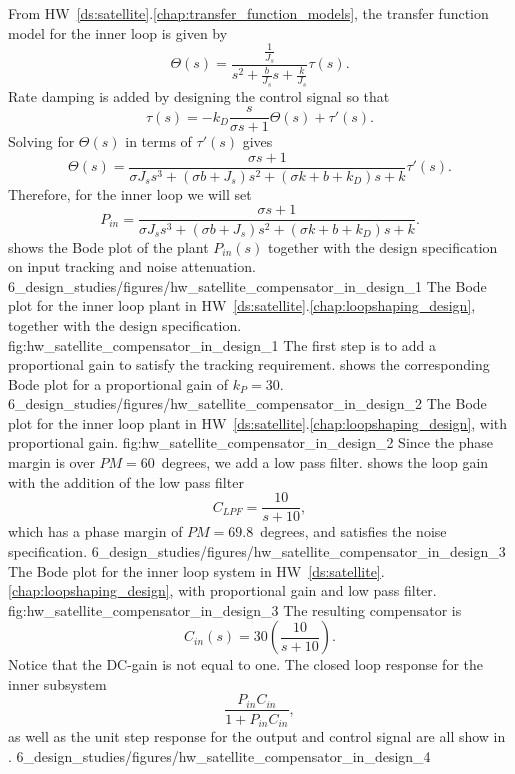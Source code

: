 From HW~\ref{ds:satellite}.\ref{chap:transfer_function_models}, the transfer function model for the inner loop is given by
\[
\Theta(s)  = \frac{\frac{1}{J_s}}{s^2+\frac{b}{J_s}s+\frac{k}{J_s}}\tau(s).
\]
Rate damping is added by designing the control signal so that
\[
\tau(s) = -k_D\frac{s}{\sigma s+1}\Theta(s) + \tau'(s).
\]
Solving for $\Theta(s)$ in terms of $\tau'(s)$ gives
\[
\Theta(s)  = \frac{\sigma s + 1}{\sigma J_s s^3 + (\sigma b + J_s)s^2+(\sigma k + b + k_D)s + k}\tau'(s).
\]
Therefore, for the inner loop we will set
\[
P_{in} = \frac{\sigma s + 1}{\sigma J_s s^3 + (\sigma b + J_s)s^2+(\sigma k + b + k_D)s + k}.
\]
 shows the Bode plot of the plant $P_{in}(s)$ together with the design specification on input tracking and noise attenuation.
%
	{6_design_studies/figures/hw_satellite_compensator_in_design_1}
   	{The Bode plot for the inner loop plant in HW~\ref{ds:satellite}.\ref{chap:loopshaping_design}, together with the design specification.}
   	{fig:hw_satellite_compensator_in_design_1}
The first step is to add a proportional gain to satisfy the tracking requirement.
 shows the corresponding Bode plot for a proportional gain of $k_P=30$.
	{6_design_studies/figures/hw_satellite_compensator_in_design_2}
   	{The Bode plot for the inner loop plant in HW~\ref{ds:satellite}.\ref{chap:loopshaping_design}, with proportional gain.}
   	{fig:hw_satellite_compensator_in_design_2}
Since the phase margin is over $PM=60$~degrees, we add a low pass filter.  
 shows the loop gain with the addition of the low pass filter
\[
C_{LPF} = \frac{10}{s+10},
\]
which has a phase margin of $PM=69.8$~degrees, and satisfies the noise specification.
	{6_design_studies/figures/hw_satellite_compensator_in_design_3}
   	{The Bode plot for the inner loop system in HW~\ref{ds:satellite}.\ref{chap:loopshaping_design}, with proportional gain and low pass filter.}
   	{fig:hw_satellite_compensator_in_design_3}
The resulting compensator is
\[
C_{in}(s) = 30\left(\frac{10}{s+10}\right).
\]
Notice that the DC-gain is not equal to one.
The closed loop response for the inner subsystem
\[
\frac{P_{in}C_{in}}{1+P_{in}C_{in}},
\] 
as well as the unit step response for the output and control signal are all show in .
	{6_design_studies/figures/hw_satellite_compensator_in_design_4}
